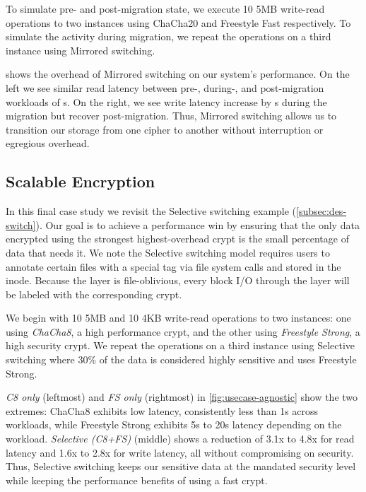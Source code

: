 To simulate pre- and post-migration state, we execute 10 5MB write-read
operations to two \sys instances using ChaCha20 and Freestyle Fast respectively.
To simulate the activity during migration, we repeat the operations on a third
instance using Mirrored switching.



 shows the overhead of Mirrored switching on our
system's performance. On the left we see similar read latency between pre-,
during-, and post-migration workloads of s. On the right, we see write
latency increase by s during the migration but recover post-migration.
Thus, Mirrored switching allows us to transition our storage from one cipher to
another without interruption or egregious overhead.


\subsection{Scalable Encryption}\label{subsec:usecase-agnostic}

In this final case study we revisit the Selective switching example
(\cref{subsec:des-switch}). Our goal is to achieve a performance win by ensuring
that the only data encrypted using the strongest highest-overhead crypt is the
small percentage of data that needs it. We note the Selective switching model
requires users to annotate certain files with a special tag via file system
calls and stored in the inode. Because the \sys layer is file-oblivious, every
block I/O through the \sys layer will be labeled with the corresponding crypt.

We begin with 10 5MB and 10 4KB write-read operations to two \sys instances: one
using {\em ChaCha8}, a high performance crypt, and the other using {\em
Freestyle Strong}, a high security crypt. We repeat the operations on a third
instance using Selective switching where 30\% of the data is considered highly
sensitive and uses Freestyle Strong.



{\em C8 only} (leftmost) and {\em FS only} (rightmost) in
\cref{fig:usecase-agnostic} show the two extremes: ChaCha8 exhibits low latency,
consistently less than 1s across workloads, while Freestyle Strong exhibits 5s
to 20s latency depending on the workload. {\em Selective (C8+FS)} (middle) shows
a reduction of 3.1x to 4.8x for read latency and 1.6x to 2.8x for write latency,
all without compromising on security. Thus, Selective switching keeps our
sensitive data at the mandated security level while keeping the performance
benefits of using a fast crypt.
